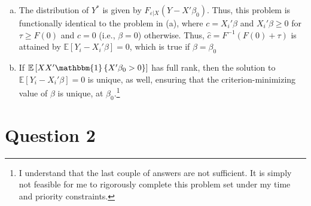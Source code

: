 \documentclass{article}
\newcommand{\one}[1]{\mathbbm{1}\left\{#1\right\}}
\newcommand{\eps}{\varepsilon}
\newcommand{\chat}{\hat{c}}
\newcommand{\E}[1]{\mathbb{E}\left[#1\right]}%
\begin{document}
\begin{enumerate}[(a)]
\begin{enumerate}[(i)]
            \item $B$ is compact\textemdash Since $B$ is a subset of a compact space, $B$ is compact.
        \end{enumerate}
        The limiting criterion function is simply $E{g(X,\beta)}$:\[
            Q(\beta) = \E{\left(\tau - \one{Y<X'\beta\one{X'\beta\geq0}}\right)\left(Y - X'\beta\one{X'\beta}\right)}
        \]
    \item The distribution of $Y^*$ is given by $F_{\eps|X}(Y-X'\beta_0)$. Thus, this problem is functionally identical to the problem in (a), where ${c=X_i'\beta}$ and ${X_i'\beta\geq 0}$ for $\tau\geq F(0)$ and $c=0$ (i.e., $\beta=0$) otherwise. Thus, ${\chat = F^{-1}(F(0) + \tau)}$ is attained by ${\E{Y_i - X_i'\beta} = 0}$, which is true if ${\beta = \beta_0}$
    
    \item If ${\E{XX'\one{X'\beta_0>0}}}$ has full rank, then the solution to ${\E{Y_i - X_i'\beta} = 0}$ is unique, as well, ensuring that the criterion-minimizing value of $\beta$ is unique, at $\beta_0$.\footnote{I understand that the last couple of answers are not sufficient. It is simply not feasible for me to rigorously complete this problem set under my time and priority constraints.}
\end{enumerate}

\section*{Question 2}
\end{document}

